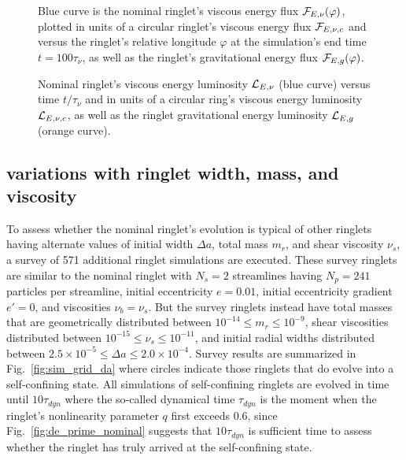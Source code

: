 \documentclass[preprint]{aastex62}
\begin{document}
\begin{figure}
    \caption{
        \label{fig:nominal_energy_flux}
        Blue curve is the nominal ringlet's viscous energy flux ${\cal F}_{E,\nu}(\varphi)$, plotted 
        in units of a circular ringlet's viscous energy flux ${\cal F}_{E,\nu,c}$ 
        and versus the ringlet's relative longitude $\varphi$ at the simulation's end time $t=100\tau_\nu$, 
        as well as the ringlet's gravitational energy flux ${\cal F}_{E,g}(\varphi)$.
    }
\end{figure}

\begin{figure}
    \caption{
        \label{fig:nominal_energy_luminosity}
        Nominal ringlet's viscous energy luminosity ${\cal L}_{E,\nu}$ (blue curve) versus time $t/\tau_\nu$
        and in units of a circular ring's viscous energy luminosity ${\cal L}_{E,\nu,c}$, 
        as well as the ringlet gravitational energy luminosity ${\cal L}_{E,g}$ (orange curve).
    }
\end{figure}


\subsection{variations with ringlet width, mass, and viscosity}
\label{subsec:variations}

To assess whether the nominal ringlet's evolution is typical of other ringlets
having alternate values of initial width $\Delta a$, total mass $m_r$, and shear viscosity $\nu_s$,
a survey of 571 additional ringlet simulations are executed. 
These survey ringlets are similar to the nominal ringlet 
with $N_s=2$ streamlines having $N_p=241$ particles per streamline, initial 
eccentricity $e=0.01$, initial eccentricity gradient $e'=0$, and viscosities $\nu_b=\nu_s$. 
But the survey ringlets instead have
total masses that are geometrically distributed between $10^{-14}\le m_r\le10^{-9}$,
shear viscosities distributed between $10^{-15}\le \nu_s\le 10^{-11}$,
and initial radial widths distributed between  
$2.5\times10^{-5}\le \Delta a\le2.0\times10^{-4}$. Survey results are summarized in Fig.\ \ref{fig:sim_grid_da}
where circles indicate those ringlets that do evolve into a self-confining state.
All simulations of self-confining ringlets are evolved in time until 
$10\tau_{dyn}$ where the so-called dynamical time $\tau_{dyn}$ is the moment when
the ringlet's nonlinearity parameter $q$ first exceeds $0.6$, since Fig.\ \ref{fig:de_prime_nominal}
suggests that $10\tau_{dyn}$ is sufficient time to assess whether the ringlet
has truly arrived at the self-confining state. 
\end{document}
